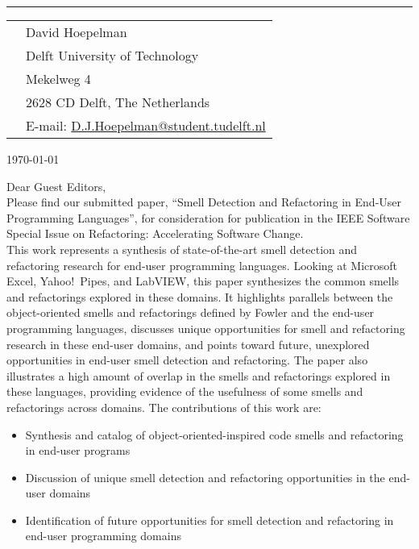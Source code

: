 \documentclass[9pt]{article}
\newcommand{\HRule}{\rule{\columnwidth}{0.25mm}}
\begin{document}
\vspace{-6pt}
\HRule

\vspace{20pt}

\begin{tabular}{p{3.90in}l}
&David Hoepelman\\
&Delft University of Technology\\
&Mekelweg 4\\
&2628 CD Delft, The Netherlands\\
& E-mail: \href{mailto:D.J.Hoepelman@student.tudelft.nl}{D.J.Hoepelman@student.tudelft.nl}\\
\end{tabular}

\vspace{20pt}

\begin{flushright}
\today
\end{flushright}

\vspace{20pt}

\noindent Dear Guest Editors,\\

\noindent Please find our submitted paper, ``Smell Detection and Refactoring in End-User Programming Languages'', for consideration for publication in the IEEE Software Special Issue on Refactoring: Accelerating Software Change. \\

\noindent This work represents a synthesis of state-of-the-art smell detection and refactoring research for end-user programming languages. 
Looking at Microsoft Excel, Yahoo!\ Pipes, and LabVIEW, this paper synthesizes the common smells and refactorings explored in these domains.
It highlights parallels between the object-oriented smells and refactorings defined by Fowler and the end-user programming languages, discusses unique opportunities for smell and refactoring research in these end-user domains, and points toward future, unexplored opportunities in end-user smell detection and refactoring.
The paper also illustrates a high amount of overlap in the smells and refactorings explored in these languages, providing evidence of the usefulness of some smells and refactorings across domains.
The contributions of this work are:

\begin{itemize}
	\item Synthesis and catalog of object-oriented-inspired code smells  and refactoring in end-user programs
	\item Discussion of unique smell detection and refactoring opportunities in the end-user domains 
	\item Identification of future opportunities for smell detection and refactoring in end-user programming domains
\end{itemize}
\end{document}
